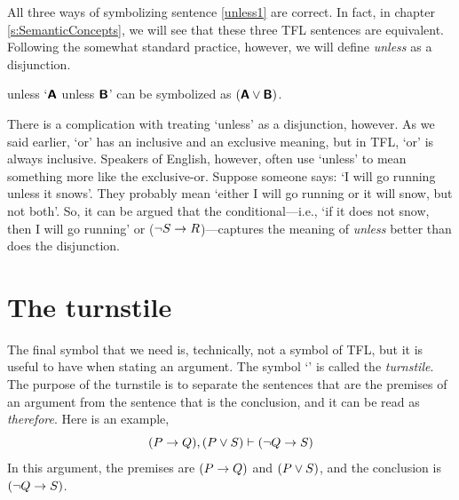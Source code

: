 All three ways of symbolizing sentence \ref{unless1} are correct. In fact, in chapter \ref{s:SemanticConcepts}, we will see that these three TFL sentences are equivalent. Following the somewhat standard practice, however, we will define \textit{unless} as a disjunction.
	
\begin{factboxy}{unless}
`$\bm{\mathsf{A}}$ unless $\bm{\mathsf{B}}$' can be symbolized as $(\bm{\mathsf{A}}\vee\bm{\mathsf{B}})$.
\end{factboxy}

There is a complication with treating `unless' as a disjunction, however. As we said earlier, `or' has an inclusive and an exclusive meaning, but in TFL, `or' is always inclusive. Speakers of English, however, often use `unless' to mean something more like the exclusive-or. Suppose someone says: `I will go running unless it snows'. They probably mean `either I will go running or it will snow, but not both'. So, it can be argued that the conditional---i.e., `if it does not snow, then I will go running' or (${\neg} S \rightarrow R$)---captures the meaning of \textit{unless} better than does the disjunction.


\section{The turnstile}

The final symbol that we need is, technically, not a symbol of TFL, but it is useful to have when stating an argument. The symbol `\proves' is called the \textit{turnstile}. The purpose of the turnstile is to separate the sentences that are the premises of an argument from the sentence that is the conclusion, and it can be read as \textit{therefore}. Here is an example,
$$(P \rightarrow Q), (P \vee S) \vdash ({\neg} Q \rightarrow S)$$
In this argument, the premises are $(P \rightarrow Q)$ and $(P \vee S)$, and the conclusion is $({\neg} Q \rightarrow S)$.








